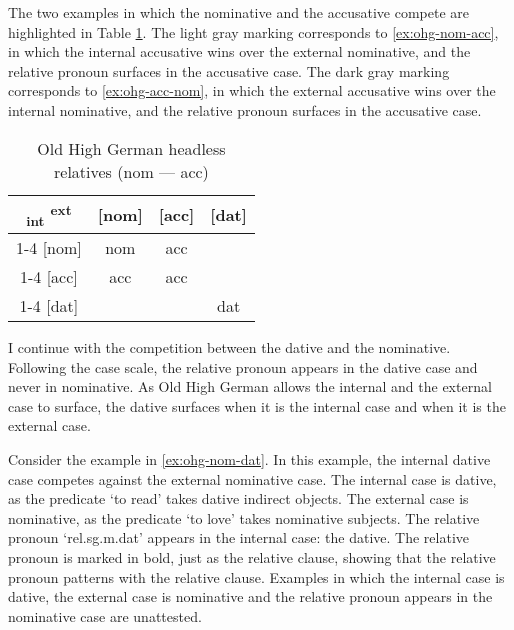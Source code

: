 The two examples in which the nominative and the accusative compete are highlighted in Table \ref{tbl:summary-old-high-german-nom-acc}. The light gray marking corresponds to \ref{ex:ohg-nom-acc}, in which the internal accusative wins over the external nominative, and the relative pronoun surfaces in the accusative case. The dark gray marking corresponds to \ref{ex:ohg-acc-nom}, in which the external accusative wins over the internal nominative, and the relative pronoun surfaces in the accusative case.

\begin{table}[H]
  \center
  \caption{Old High German headless relatives (\ac{nom} --- \ac{acc})}
  \begin{tabular}{c|c|c|c}
    \toprule
        \textsubscript{\ac{int}} \textsuperscript{\ac{ext}}
          & [\ac{nom}]
          & [\ac{acc}]
          & [\ac{dat}]
          \\ \cmidrule{1-4}
      [\ac{nom}]
          & \ac{nom}
          & \cellcolor{DG}\ac{acc}
          &
          \\ \cmidrule{1-4}
      [\ac{acc}]
          & \cellcolor{LG}\ac{acc}
          & \ac{acc}
          &
          \\ \cmidrule{1-4}
      [\ac{dat}]
          &
          &
          & \ac{dat}
          \\
    \bottomrule
  \end{tabular}
    \label{tbl:summary-old-high-german-nom-acc}
\end{table}

I continue with the competition between the dative and the nominative. Following the case scale, the relative pronoun appears in the dative case and never in nominative. As Old High German allows the internal and the external case to surface, the dative surfaces when it is the internal case and when it is the external case.

Consider the example in \ref{ex:ohg-nom-dat}. In this example, the internal dative case competes against the external nominative case.
The internal case is dative, as the predicate  `to read' takes dative indirect objects.
The external case is nominative, as the predicate  `to love' takes nominative subjects.
The relative pronoun  `\ac{rel}.\ac{sg}.\ac{m}.\ac{dat}' appears in the internal case: the dative. The relative pronoun is marked in bold, just as the relative clause, showing that the relative pronoun patterns with the relative clause.
Examples in which the internal case is dative, the external case is nominative and the relative pronoun appears in the nominative case are unattested.

